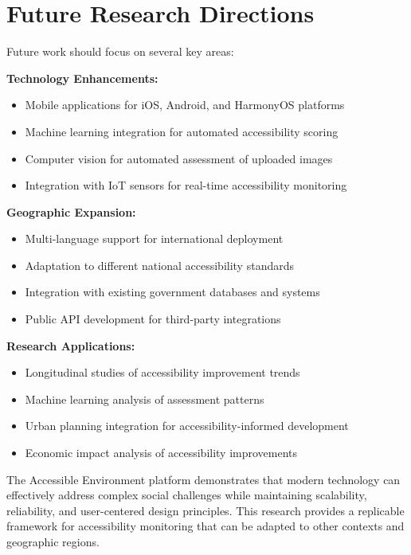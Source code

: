\documentclass[a4paper,12pt,oneside]{book}
\begin{document}
\section{Future Research Directions}

Future work should focus on several key areas:

\textbf{Technology Enhancements:}
\begin{itemize}
    \item Mobile applications for iOS, Android, and HarmonyOS platforms
    \item Machine learning integration for automated accessibility scoring
    \item Computer vision for automated assessment of uploaded images
    \item Integration with IoT sensors for real-time accessibility monitoring
\end{itemize}

\textbf{Geographic Expansion:}
\begin{itemize}
    \item Multi-language support for international deployment
    \item Adaptation to different national accessibility standards
    \item Integration with existing government databases and systems
    \item Public API development for third-party integrations
\end{itemize}

\textbf{Research Applications:}
\begin{itemize}
    \item Longitudinal studies of accessibility improvement trends
    \item Machine learning analysis of assessment patterns
    \item Urban planning integration for accessibility-informed development
    \item Economic impact analysis of accessibility improvements
\end{itemize}

The Accessible Environment platform demonstrates that modern technology can effectively address complex social challenges while maintaining scalability, reliability, and user-centered design principles. This research provides a replicable framework for accessibility monitoring that can be adapted to other contexts and geographic regions.
\end{document}
